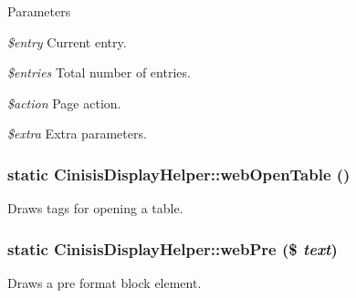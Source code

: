\begin{DoxyParams}{Parameters}
\item[{\em \$entry}]Current entry.\item[{\em \$entries}]Total number of entries.\item[{\em \$action}]Page action.\item[{\em \$extra}]Extra parameters. \end{DoxyParams}
\hypertarget{classCinisisDisplayHelper_a4028def92d8511e525251ec7ab06246d}{
\subsubsection[{webOpenTable}]{\setlength{\rightskip}{0pt plus 5cm}static CinisisDisplayHelper::webOpenTable ()}}
\label{classCinisisDisplayHelper_a4028def92d8511e525251ec7ab06246d}
Draws tags for opening a table. \hypertarget{classCinisisDisplayHelper_a528283a8b16090918f1878dca5ee24fb}{
\subsubsection[{webPre}]{\setlength{\rightskip}{0pt plus 5cm}static CinisisDisplayHelper::webPre (\$ {\em text})}}
\label{classCinisisDisplayHelper_a528283a8b16090918f1878dca5ee24fb}
Draws a pre format block element.


